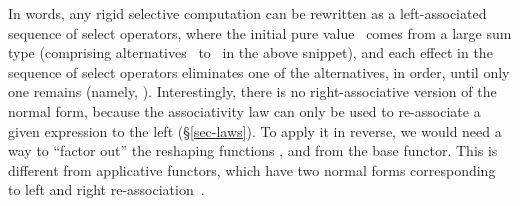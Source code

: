 \noindent
In words, any rigid selective computation can be rewritten as a left-associated
sequence of select operators, where the initial pure value~ comes from a
large sum type (comprising alternatives~ to~ in the above snippet),
and each effect in the sequence of select operators eliminates one of the
alternatives, in order, until only one remains (namely, ). Interestingly,
there is no right-associative version of the normal form, because the
associativity law can only be used to re-associate a given expression to the
left (\S\ref{sec-laws}). To apply it in reverse, we would need a way to
``factor out'' the reshaping functions ,  and  from the base
functor. This is different from applicative functors, which have two normal
forms corresponding to left and right re-association~\citep{free-applicatives}.

